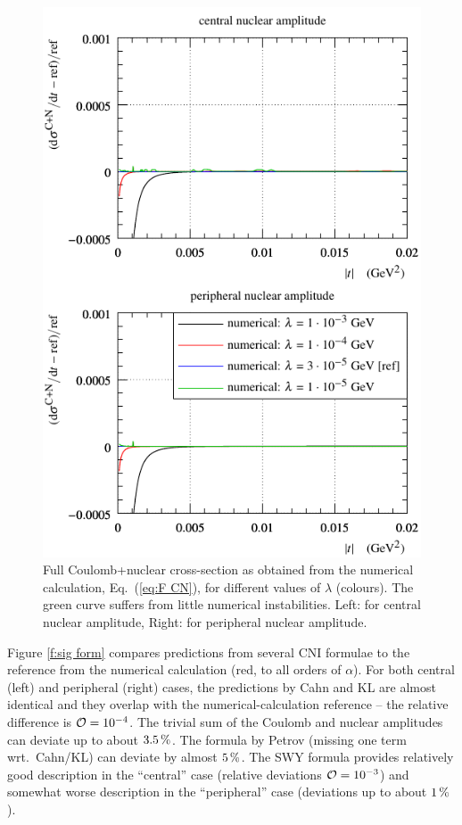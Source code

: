 \documentclass[pdftex,twocolumn,epjc3]{svjour3}
\def\un#1{\,{\rm #1}}
\begin{document}
\begin{figure}[h]
\begin{center}
\includegraphics{fig/cni_dsdt_cmp_lambda.pdf}
\caption{Full Coulomb+nuclear cross-section as obtained from the numerical calculation, Eq.~(\ref{eq:F CN}), for different values of $\lambda$ (colours). The green curve suffers from little numerical instabilities. Left: for central nuclear amplitude, Right: for peripheral nuclear amplitude.}
\label{f:sig CN}
\end{center}
\end{figure}

Figure \ref{f:sig form} compares predictions from several CNI formulae to the reference from the numerical calculation (red, to all orders of $\alpha$). For both central (left) and peripheral (right) cases, the predictions by Cahn and KL are almost identical and they overlap with the numerical-calculation reference -- the relative difference is ${\cal O} = 10^{-4}$. The trivial sum of the Coulomb and nuclear amplitudes can deviate up to about $3.5\un{\%}$. The formula by Petrov (missing one term wrt.~Cahn/KL) can deviate by almost $5\un{\%}$. The SWY formula provides relatively good description in the ``central'' case (relative deviations ${\cal O} = 10^{-3}$) and somewhat worse description in the ``peripheral'' case (deviations up to about $1\un{\%}$).
\end{document}
